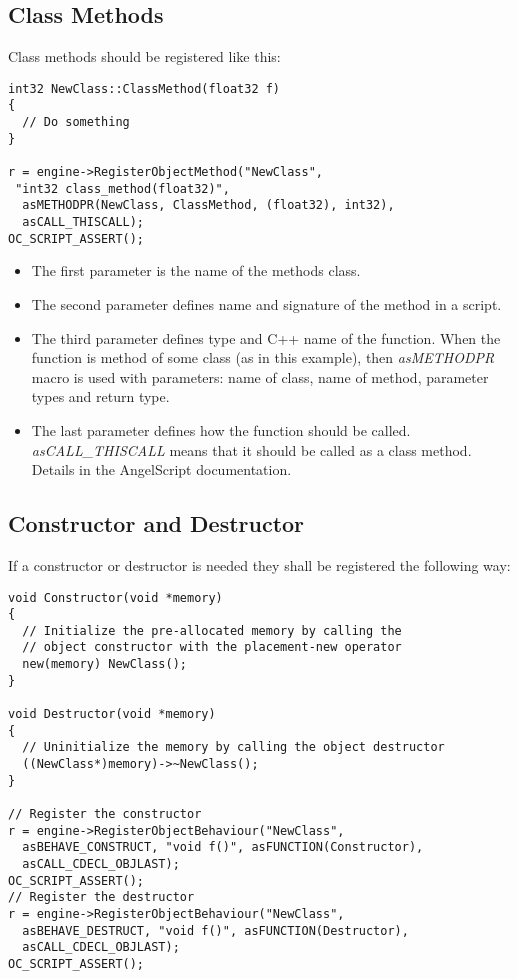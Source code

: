 \documentclass[a4paper, 12pt]{report}
\begin{document}
\subsection{Class Methods}
Class methods should be registered like this:

\footnotesize 
\begin{verbatim}
int32 NewClass::ClassMethod(float32 f)
{
  // Do something
}

r = engine->RegisterObjectMethod("NewClass",
 "int32 class_method(float32)", 
  asMETHODPR(NewClass, ClassMethod, (float32), int32),
  asCALL_THISCALL);
OC_SCRIPT_ASSERT();
\end{verbatim}
\normalsize

\begin{itemize}
\item
The first parameter is the name of the methods class.
\item
The second parameter defines name and signature of the method in a script.
\item
The third parameter defines type and C++ name of the function. When the function is method of some class (as in this example), then \emph{asMETHODPR} macro is used with parameters: name of class, name of method, parameter types and return type.
\item
The last parameter defines how the function should be called. \emph{asCALL\_THISCALL} means that it should be called as a class method. Details in the AngelScript documentation.
\end{itemize}

\subsection{Constructor and Destructor}

If a constructor or destructor is needed they shall be registered the following way:

\footnotesize 
\begin{verbatim}
void Constructor(void *memory)
{
  // Initialize the pre-allocated memory by calling the
  // object constructor with the placement-new operator
  new(memory) NewClass();
}

void Destructor(void *memory)
{
  // Uninitialize the memory by calling the object destructor
  ((NewClass*)memory)->~NewClass();
}

// Register the constructor
r = engine->RegisterObjectBehaviour("NewClass",
  asBEHAVE_CONSTRUCT, "void f()", asFUNCTION(Constructor),
  asCALL_CDECL_OBJLAST);
OC_SCRIPT_ASSERT();
// Register the destructor
r = engine->RegisterObjectBehaviour("NewClass",
  asBEHAVE_DESTRUCT, "void f()", asFUNCTION(Destructor),
  asCALL_CDECL_OBJLAST);
OC_SCRIPT_ASSERT();

\end{verbatim}
\normalsize
\end{document}
